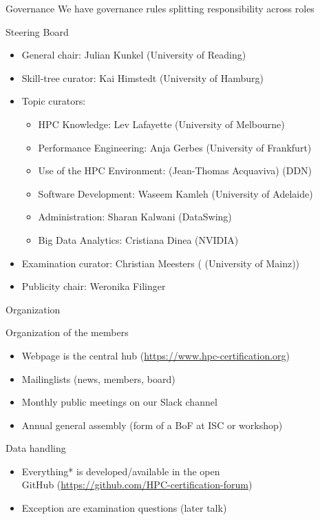\documentclass[compress,aspectratio=169]{beamer}
\begin{document}
\begin{frame}{Governance}
	\smallskip
  We have governance rules splitting responsibility across roles
  \begin{block}{Steering Board}
  \vspace*{-0.5em}
  \begin{itemize}
    \item General chair: Julian Kunkel (University of Reading)
    \item Skill-tree curator: Kai Himstedt (University of Hamburg)
    \item Topic curators:
    \begin{itemize}
      \item HPC Knowledge: Lev Lafayette (University of Melbourne)
      \item Performance Engineering: Anja Gerbes (University of Frankfurt)
      \item Use of the HPC Environment: (Jean-Thomas Acquaviva) (DDN)
      \item Software Development: Waseem Kamleh (University of Adelaide)
			\item Administration: Sharan Kalwani (DataSwing)
			\item Big Data Analytics: Cristiana Dinea (NVIDIA)
    \end{itemize}
    \item Examination curator: Christian Meesters ( (University of Mainz))
    \item Publicity chair: Weronika Filinger
  \end{itemize}
  \end{block}
\end{frame}



\begin{frame}{Organization}
  \begin{block}{Organization of the members}
	\begin{itemize}
  \item Webpage is the central hub (\url{https://www.hpc-certification.org})
  \item Mailinglists (news, members, board)
	\item Monthly public meetings on our Slack channel
  \item Annual general assembly (form of a BoF at ISC or workshop)
  \end{itemize}
  \end{block}

  \begin{block}{Data handling}
    \begin{itemize}
      \item Everything* is developed/available in the open \\
        GitHub (\url{https://github.com/HPC-certification-forum})
      \item Exception are examination questions (later talk)
    \end{itemize}
  \end{block}
\end{frame}
\end{document}
